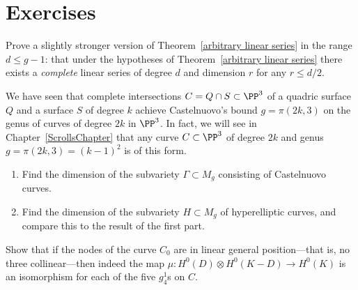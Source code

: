 %


\section{Exercises}

\begin{exercise}
Prove a slightly stronger version of Theorem~\ref{arbitrary linear series} in the range $d \leq g-1$: that under the hypotheses of Theorem~\ref{arbitrary linear series} there exists a \emph{complete} linear series of degree $d$ and dimension $r$ for any $r \leq d/2$.
\end{exercise}

\begin{exercise}\label{rarity of Castelnuovo}
We have seen that complete intersections $C = Q \cap S \subset \PP^3$ of a quadric surface $Q$ and a surface $S$ of degree $k$ achieve Castelnuovo's bound $g = \pi(2k, 3)$ on the genus of curves of degree $2k$ in $\PP^3$. In fact, we will see in Chapter~\ref{ScrollsChapter} that any curve $C \subset \PP^3$ of degree $2k$ and genus $g = \pi(2k, 3) = (k-1)^2$ is of this form.
\begin{enumerate}
\item Find the dimension of the subvariety $\Gamma \subset M_g$ consisting of Castelnuovo curves.
\item Find the dimension of the subvariety $H \subset M_g$ of hyperelliptic curves, and compare this to the result of the first part.
\end{enumerate}
\end{exercise}


\begin{exercise}
Show that if the nodes of the curve $C_0$ are in linear general position---that is, no three collinear---then indeed the map $\mu : H^0(D) \otimes H^0(K-D) \to H^0(K)$ is an isomorphism for each of the five $g^1_4$s on $C$.
\end{exercise}

